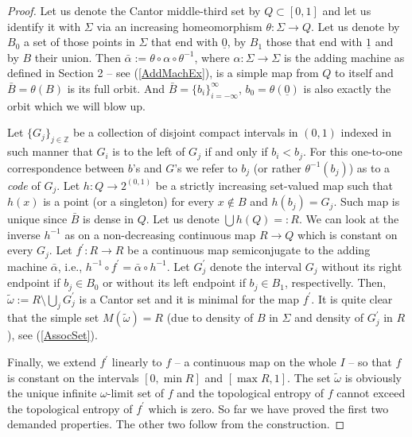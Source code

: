 \documentclass{amsart}
\begin{document}
\begin{proof}
Let us denote the Cantor middle-third set by $Q \subset [0,1]$ and let us identify it with $\Sigma$ via an increasing homeomorphism $\theta: \Sigma \rightarrow Q$. Let us denote by $B_0$ a set of those points in $\Sigma$ that end with $\underline{0}$, by $B_1$ those that end with $\underline{1}$ and by $B$ their union. Then $\bar{\alpha} := \theta \circ \alpha \circ \theta^{-1}$, where $\alpha\!\!: \Sigma \rightarrow \Sigma$ is the adding machine as defined in Section 2 -- see (\ref{AddMachEx}), is a simple map from $Q$ to itself and $\bar{B} = \theta(B)$ is its full orbit. And $\bar{B} = \{b_i\}_{i = -\infty}^\infty$, $b_0 = \theta(\underline{0})$ is also exactly the orbit which we will blow up.

Let $\{G_j\}_{j\in\mathbb{Z}}$ be a collection of disjoint compact intervals in $(0,1)$ indexed in such manner that $G_i$ is to the left of $G_j$ if and only if $b_i < b_j$. For this one-to-one correspondence between $b$'s and $G$'s we refer to $b_j$ (or rather $\theta^{-1}(b_j)$) as to a {\sl code} of $G_j$. Let $h\!: Q \rightarrow 2^{(0,1)}$ be a strictly increasing set-valued map such that $h(x)$ is a point (or a singleton) for every $x\not\in B$ and $h(b_j) = G_j$. Such map is unique since $\bar{B}$ is dense in $Q$. Let us denote $\bigcup h(Q) =: R$. We can look at the inverse $h^{-1}$ as on a non-decreasing continuous map $R \rightarrow Q$ which is constant on every $G_j$. Let $f^\prime\!: R \rightarrow R$ be a continuous map semiconjugate to the adding machine $\bar{\alpha}$, i.e., $h^{-1}\circ f^{\prime} = \bar{\alpha}\circ h^{-1}$. Let $G^\prime_j$ denote the interval $G_j$ without its right endpoint if $b_j\in B_0$ or without its left endpoint if $b_j\in B_1$, respectivelly. Then, $\tilde{\omega} := R\setminus \bigcup_j G^\prime_j$ is a Cantor set and it is minimal for the map $f^\prime$. It is quite clear that the simple set $M(\tilde{\omega}) = R$ (due to density of $B$ in $\Sigma$ and density of $G^\prime_j$ in $R$), see (\ref{AssocSet}).

Finally, we extend $f^\prime$ linearly to $f$ -- a continuous map on the whole $I$ -- so that $f$ is constant on the intervals $[0,\min R]$ and $[\max R, 1]$. The set $\tilde{\omega}$ is obviously the unique infinite $\omega$-limit set of $f$ and the topological entropy of $f$ cannot exceed the topological entropy of $f^\prime$ which is zero. So far we have proved the first two demanded properties. The other two follow from the construction.
\end{proof}
\end{document}
